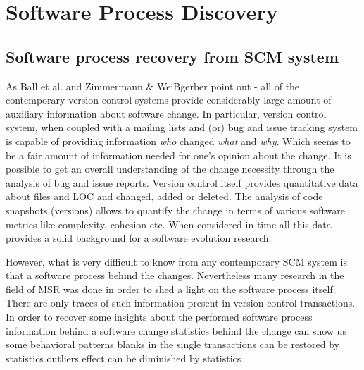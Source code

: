 \chapter{Software Process Discovery}
\section{Software process recovery from SCM system}
As Ball et al. \cite{citeulike:9004378} and Zimmermann \& WeiBgerber
\cite{citeulike:5058462} point out - all of the contemporary version control
systems provide considerably large amount of auxiliary information about
software change. In particular, version control system, when coupled with a
mailing lists and (or) bug and issue tracking system is capable of providing
information \textit{who} changed \textit{what} and \textit{why}. Which seems to
be a fair amount of information needed for one's opinion about the change. It is
possible to get an overall understanding of the change necessity through the
analysis of bug and issue reports. Version control itself provides quantitative
data about files and LOC and changed, added or deleted. The analysis of code
snapshots (versions) allows to quantify the change in terms of various software
metrics like complexity, cohesion etc. When considered in time all this data
provides a solid background for a software evolution research.

However, what is very difficult to know from any contemporary SCM system is that
a software process behind the changes. Nevertheless many research in the field
of MSR was done in order to shed a light on the software process itself.
\cite{citeulike:9007622} There are only traces of such information present in
version control transactions. In order to recover some insights about the
performed software process information behind a software change statistics
behind the change can show us some behavioral patterns blanks in the single
transactions can be restored by statistics
outliers effect can be diminished by statistics

